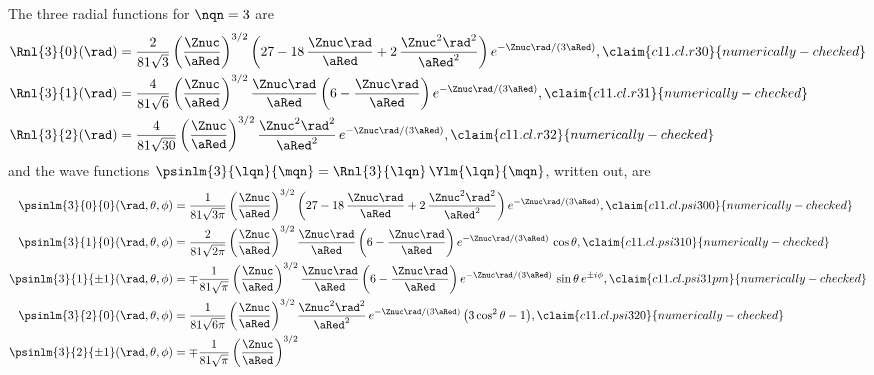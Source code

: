 \begin{vertiefung}
  The three radial functions for $\nqn = 3$ are
  \begin{align}
    \Rnl{3}{0}(\rad) &= \frac{2}{81\sqrt{3}}\left(\frac{\Znuc}{\aRed}\right)^{3/2}
      \left(27 - 18\,\frac{\Znuc\rad}{\aRed} + 2\,\frac{\Znuc^2\rad^2}{\aRed^2}\right)
      e^{-\Znuc\rad/(3\aRed)},
      \label{c11.eq.r30}\claim{c11.cl.r30}{numerically-checked} \\
    \Rnl{3}{1}(\rad) &= \frac{4}{81\sqrt{6}}\left(\frac{\Znuc}{\aRed}\right)^{3/2}
      \frac{\Znuc\rad}{\aRed}\left(6 - \frac{\Znuc\rad}{\aRed}\right)
      e^{-\Znuc\rad/(3\aRed)},
      \label{c11.eq.r31}\claim{c11.cl.r31}{numerically-checked} \\
    \Rnl{3}{2}(\rad) &= \frac{4}{81\sqrt{30}}\left(\frac{\Znuc}{\aRed}\right)^{3/2}
      \frac{\Znuc^2\rad^2}{\aRed^2}\,e^{-\Znuc\rad/(3\aRed)},
      \label{c11.eq.r32}\claim{c11.cl.r32}{numerically-checked}
  \end{align}
  and the wave functions $\psinlm{3}{\lqn}{\mqn} = \Rnl{3}{\lqn}\,\Ylm{\lqn}{\mqn}$,
  written out, are
  \begin{align}
    \psinlm{3}{0}{0}(\rad, \theta, \phi) &= \frac{1}{81\sqrt{3\pi}}
      \left(\frac{\Znuc}{\aRed}\right)^{3/2}
      \left(27 - 18\,\frac{\Znuc\rad}{\aRed} + 2\,\frac{\Znuc^2\rad^2}{\aRed^2}\right)
      e^{-\Znuc\rad/(3\aRed)},
      \label{c11.eq.psi300}\claim{c11.cl.psi300}{numerically-checked} \\
    \psinlm{3}{1}{0}(\rad, \theta, \phi) &= \frac{2}{81\sqrt{2\pi}}
      \left(\frac{\Znuc}{\aRed}\right)^{3/2}
      \frac{\Znuc\rad}{\aRed}\left(6 - \frac{\Znuc\rad}{\aRed}\right)
      e^{-\Znuc\rad/(3\aRed)}\,\cos\theta,
      \label{c11.eq.psi310}\claim{c11.cl.psi310}{numerically-checked} \\
    \psinlm{3}{1}{\pm 1}(\rad, \theta, \phi) &= \mp\frac{1}{81\sqrt{\pi}}
      \left(\frac{\Znuc}{\aRed}\right)^{3/2}
      \frac{\Znuc\rad}{\aRed}\left(6 - \frac{\Znuc\rad}{\aRed}\right)
      e^{-\Znuc\rad/(3\aRed)}\,\sin\theta\,e^{\pm i\phi},
      \label{c11.eq.psi31pm}\claim{c11.cl.psi31pm}{numerically-checked} \\
    \psinlm{3}{2}{0}(\rad, \theta, \phi) &= \frac{1}{81\sqrt{6\pi}}
      \left(\frac{\Znuc}{\aRed}\right)^{3/2}
      \frac{\Znuc^2\rad^2}{\aRed^2}\,e^{-\Znuc\rad/(3\aRed)}\,
      \bigl(3\cos^2\theta - 1\bigr),
      \label{c11.eq.psi320}\claim{c11.cl.psi320}{numerically-checked} \\
    \psinlm{3}{2}{\pm 1}(\rad, \theta, \phi) &= \mp\frac{1}{81\sqrt{\pi}}
      \left(\frac{\Znuc}{\aRed}\right)^{3/2}

\end{align}
\end{vertiefung}
